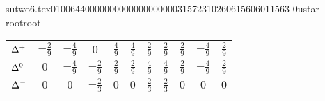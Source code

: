                                                                                                                                                                                                                                                                                       sutwo6.tex                                                                                          0100644 0000000 0000000 00000315723 10260615606 011563  0                                                                                                    ustar   root                            root                                                                                                                                                                                                                   \documentclass[prd,amssymb,amsmath,showpacs,nofootinbib,superscriptaddress]{revtex4}
\begin{document}
\begin{table}[ht]
\begin{tabular}{l | c c c c c c c | c c c }
${\Delta}^+$     &  $-\frac{2}{9}$ & $-\frac{4}{9}$  & $0$  
           &  $\frac{4}{9}$ & $\frac{4}{9}$  
           &  $\frac{2}{9}$ & $\frac{2}{9}$
           &  $\frac{2}{9}$ & $-\frac{4}{9}$ & $\frac{2}{9}$ \\

${\Delta}^0$     &  $0$ & $-\frac{4}{9}$  & $-\frac{2}{9}$  
           &  $\frac{2}{9}$ & $\frac{2}{9}$  
           &  $\frac{4}{9}$ & $\frac{4}{9}$
           &  $\frac{2}{9}$ & $-\frac{4}{9}$ & $\frac{2}{9}$ \\

${\Delta}^-$     &  $0$ & $0$  & $-\frac{2}{3}$  
           &  $0$ & $0$  
           &  $\frac{2}{3}$ & $\frac{2}{3}$
           &  $0$ & $0$ & $0$ \\
 
\end{tabular}
\label{t:PQQCD-A}
\end{table}
\end{document}
